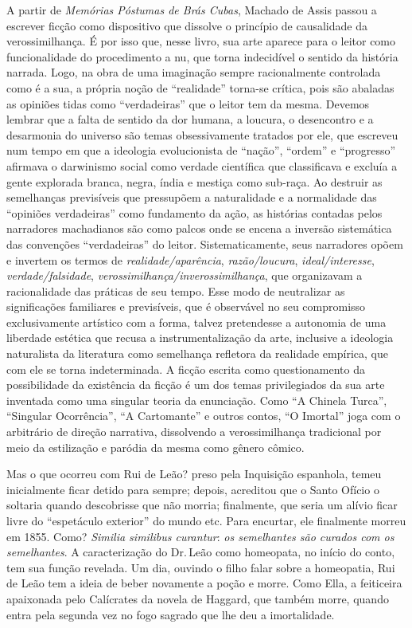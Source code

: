 A partir de \emph{Memórias Póstumas de Brás Cubas}, Machado de Assis
passou a escrever ficção como dispositivo que dissolve o princípio de
causalidade da verossimilhança. É por isso que, nesse livro, sua arte
aparece para o leitor como funcionalidade do procedimento a nu, que
torna indecidível o sentido da história narrada. Logo, na obra de uma
imaginação sempre racionalmente controlada como é a sua, a própria noção
de ``realidade'' torna-se crítica, pois são abaladas as opiniões tidas
como ``verdadeiras'' que o leitor tem da mesma. Devemos lembrar que a
falta de sentido da dor humana, a loucura, o desencontro e a desarmonia
do universo são temas obsessivamente tratados por ele, que escreveu num
tempo em que a ideologia evolucionista de ``nação'', ``ordem'' e ``progresso''
afirmava o darwinismo social como verdade científica que classificava e
excluía a gente explorada branca, negra, índia e mestiça como sub-raça.
Ao destruir as semelhanças previsíveis que pressupõem a naturalidade e a
normalidade das ``opiniões verdadeiras'' como fundamento da ação, as
histórias contadas pelos narradores machadianos são como palcos onde se
encena a inversão sistemática das convenções ``verdadeiras'' do leitor.
Sistematicamente, seus narradores opõem e invertem os termos de
\emph{realidade/aparência}, \emph{razão/loucura},
\emph{ideal/interesse}, \emph{verdade/falsidade},
\emph{verossimilhança/inverossimilhança}, que organizavam a
racionalidade das práticas de seu tempo. Esse modo de neutralizar as
significações familiares e previsíveis, que é observável no seu
compromisso exclusivamente artístico com a forma, talvez pretendesse a
autonomia de uma liberdade estética que recusa a instrumentalização da
arte, inclusive a ideologia naturalista da literatura como semelhança
refletora da realidade empírica, que com ele se torna indeterminada. A
ficção escrita como questionamento da possibilidade da existência da
ficção é um dos temas privilegiados da sua arte inventada como uma
singular teoria da enunciação. Como ``A Chinela Turca'', ``Singular
Ocorrência'', ``A Cartomante'' e outros contos, ``O Imortal'' joga com o
arbitrário de direção narrativa, dissolvendo a verossimilhança
tradicional por meio da estilização e paródia da mesma como gênero
cômico.

Mas o que ocorreu com Rui de Leão? preso pela Inquisição espanhola,
temeu inicialmente ficar detido para sempre; depois, acreditou que o
Santo Ofício o soltaria quando descobrisse que não morria; finalmente,
que seria um alívio ficar livre do ``espetáculo exterior'' do mundo etc.
Para encurtar, ele finalmente morreu em 1855. Como? \emph{Similia
similibus curantur}: \emph{os semelhantes são curados com os
semelhantes}. A caracterização do Dr.\,Leão como homeopata, no início do
conto, tem sua função revelada. Um dia, ouvindo o filho falar sobre a
homeopatia, Rui de Leão tem a ideia de beber novamente a poção e morre.
Como Ella, a feiticeira apaixonada pelo Calícrates da novela de Haggard,
que também morre, quando entra pela segunda vez no fogo sagrado que lhe
deu a imortalidade.

